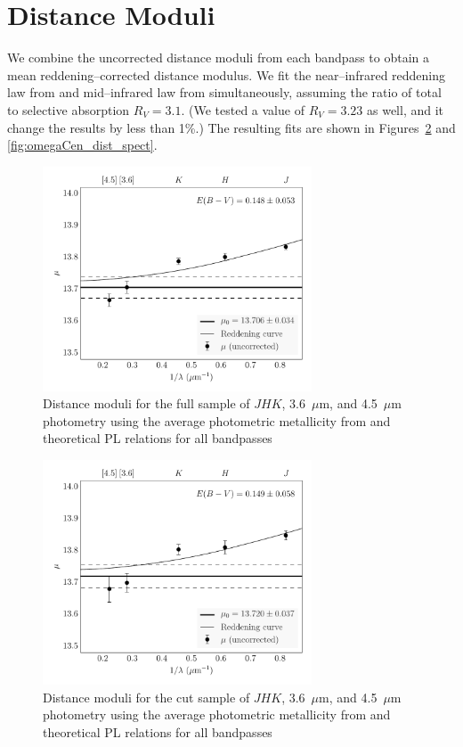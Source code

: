 \documentclass[a4paper,fleqn,usenatbib]{mnras}
\begin{document}
\section{Distance Moduli}
\label{sec:distance_moduli}

We combine the uncorrected distance moduli from each bandpass to obtain a mean reddening--corrected distance modulus. We fit the near--infrared reddening law from \citet{1989ApJ...345..245C} and mid--infrared law from \citet{2005ApJ...619..931I} simultaneously, assuming the ratio of total to selective absorption $R_V = 3.1$. (We tested a value of $R_V = 3.23$ as well, and it change the results by less than 1\%.) The resulting fits are shown in Figures~\ref{fig:omegaCen_dist_phot} and \ref{fig:omegaCen_dist_spect}.

\begin{figure}
\begin{center}
\includegraphics[width=80mm]{final_plots/multiwavelength_distance_allstars_phot.pdf}
\caption{Distance moduli for the full sample of $J\!H\!K$, 3.6~$\mu$m, and 4.5~$\mu$m photometry using the average photometric metallicity from \citet{2000AJ....119.1824R} and theoretical PL relations for all bandpasses}
\label{fig:omegaCen_dist_phot_allstar}
\end{center}
\end{figure}

\begin{figure}
\begin{center}
\includegraphics[width=80mm]{final_plots/multiwavelength_distance_samestars_phot_unweighted.pdf}
\caption{Distance moduli for the cut sample of $J\!H\!K$, 3.6~$\mu$m, and 4.5~$\mu$m photometry using the average photometric metallicity from \citet{2000AJ....119.1824R} and theoretical PL relations for all bandpasses}
\label{fig:omegaCen_dist_phot}
\end{center}
\end{figure}
\end{document}
